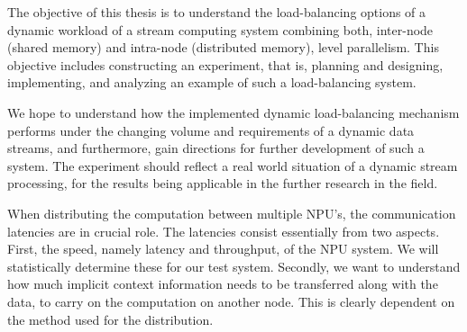 The objective of this thesis is to understand the load-balancing options of a dynamic workload of a stream computing system combining both, inter-node (shared memory) and intra-node (distributed memory), level parallelism. This objective includes constructing an experiment, that is, planning and designing, implementing, and analyzing an example of such a load-balancing system.

We hope to understand how the implemented dynamic load-balancing mechanism performs under the changing volume and requirements of a dynamic data streams, and furthermore, gain directions for further development of such a system. The experiment should reflect a real world situation of a dynamic stream processing, for the results being applicable in the further research in the field.

When distributing the computation between multiple NPU's, the communication latencies are in crucial role. The latencies consist essentially from two aspects. First, the speed, namely latency and throughput, of the NPU system. We will statistically determine these for our test system. Secondly, we want to understand how much implicit context information needs to be transferred along with the data, to carry on the computation on another node. This is clearly dependent on the method used for the distribution.


